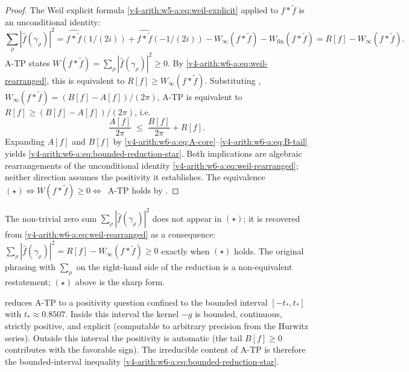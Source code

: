 \begin{proof}
The Weil explicit formula
\eqref{v4-arith:w5-a:eq:weil-explicit} applied to \(f*\widetilde{f}\)
is an unconditional identity:
\begin{equation}
\label{v4-arith:w6-a:eq:weil-rearranged}
\sum_{\rho}|\widehat{f}(\gamma_{\rho})|^{2}
=\widehat{f*\widetilde{f}}(1/(2i))+\widehat{f*\widetilde{f}}(-1/(2i))-W_{\infty}(f*\widetilde{f})-W_{\mathrm{fin}}(f*\widetilde{f})
= R[f] - W_{\infty}(f*\widetilde{f}).
\end{equation}
A-TP states \(W(f*\widetilde{f})=\sum_{\rho}|\widehat{f}(\gamma_{\rho})|^{2}\geq 0\).
By \eqref{v4-arith:w6-a:eq:weil-rearranged}, this is equivalent to
\(R[f]\geq W_{\infty}(f*\widetilde{f})\). Substituting
,
\(W_{\infty}(f*\widetilde{f})=(B[f]-A[f])/(2\pi)\), A-TP is equivalent
to \(R[f]\geq(B[f]-A[f])/(2\pi)\), i.e.
\[
\frac{A[f]}{2\pi}\;\leq\;\frac{B[f]}{2\pi}+R[f].
\]
Expanding \(A[f]\) and \(B[f]\) by
\eqref{v4-arith:w6-a:eq:A-core}--\eqref{v4-arith:w6-a:eq:B-tail}
yields \eqref{v4-arith:w6-a:eq:bounded-reduction-star}. Both
implications are algebraic rearrangements of the unconditional identity
\eqref{v4-arith:w6-a:eq:weil-rearranged}; neither direction assumes the
positivity it establishes. The equivalence
\((\star)\Leftrightarrow W(f*\widetilde{f})\geq 0\Leftrightarrow\)~A-TP
holds by .
\end{proof}

\begin{remark}
\label{v4-arith:w6-a:rem:zero-sum-consequence}
The non-trivial zero sum \(\sum_{\rho}|\widehat{f}(\gamma_{\rho})|^{2}\)
does not appear in \((\star)\); it is recovered from
\eqref{v4-arith:w6-a:eq:weil-rearranged} as a consequence:
\(\sum_{\rho}|\widehat{f}(\gamma_{\rho})|^{2}=R[f]-W_{\infty}(f*\widetilde{f})\geq 0\)
exactly when \((\star)\) holds. The original phrasing with
\(\sum_{\rho}\) on the right-hand side of the reduction is a
non-equivalent restatement; \((\star)\) above is the sharp form.
\end{remark}

\begin{remark}
\label{v4-arith:w6-a:rem:bounded-residual}
 reduces A-TP to a
positivity question confined to the bounded interval
\([-t_{\ast},t_{\ast}]\) with \(t_{\ast}\approx 0.8507\). Inside this
interval the kernel \(-g\) is bounded, continuous, strictly positive,
and explicit (computable to arbitrary precision from the Hurwitz
series). Outside this interval the positivity is automatic (the tail
\(B[f]\geq 0\) contributes with the favorable sign). The irreducible
content of A-TP is therefore the bounded-interval inequality
\eqref{v4-arith:w6-a:eq:bounded-reduction-star}.
\end{remark}


